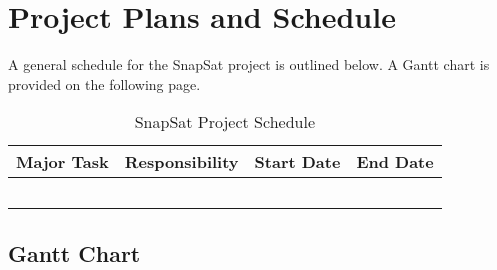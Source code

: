 \section{Project Plans and Schedule}
A general schedule for the SnapSat project is outlined below. A Gantt chart is provided on the following page.
\begin{table}[H]
    \centering
    \caption{SnapSat Project Schedule}
    \vspace{0.15cm}
    \label{tab:designoverview}
    {\renewcommand{\arraystretch}{1.4}%
        \begin{tabular}{|>{\arraybackslash}m{3.5cm}|>{\arraybackslash}m{4cm}|>{\arraybackslash}m{3.2cm}|>{\arraybackslash}m{3.2cm}|}
            \hline
            \textbf{Major Task} & \textbf{Responsibility} & {\bf Start Date} & {\bf End Date} \\ \hline\hline
             & & & \\\hline
             & & & \\\hline
             & & & \\\hline
             & & & \\\hline
             & & & \\\hline
        \end{tabular} } 
    \end{table}
    
\subsection{Gantt Chart}
